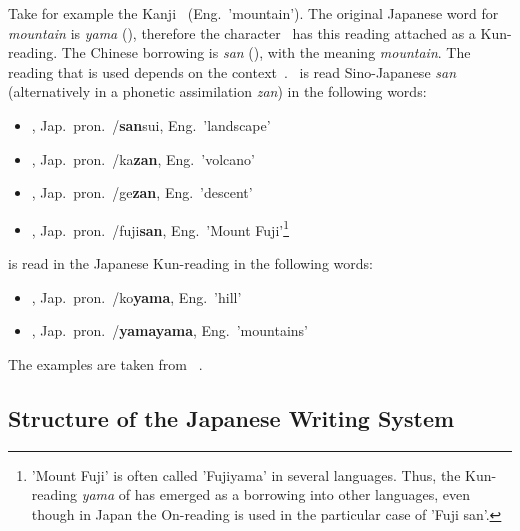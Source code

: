 Take for example the Kanji ~(Eng.\ 'mountain'). 
The original Japanese word for \emph{mountain} is \emph{yama} (),
therefore the character ~has this reading attached as a Kun-reading.
The Chinese borrowing is \emph{san} (), with the meaning 
\emph{mountain}. The reading that is used depends on the 
context~.
~is read Sino-Japanese \emph{san} (alternatively in a phonetic 
assimilation \emph{zan}) in the following words:
\begin{itemize}
  \item {}, Jap.\ pron.\ /\textbf{san}sui, Eng.\ 'landscape'
  \item {}, Jap.\ pron.\ /ka\textbf{zan}, Eng.\ 'volcano'
  \item {}, Jap.\ pron.\ /ge\textbf{zan}, Eng.\ 'descent'
  \item {}, Jap.\ pron.\ /fuji\textbf{san}, Eng.\ 
        'Mount Fuji'\footnote{'Mount Fuji' is often called 'Fujiyama' in 
        several languages. Thus, the Kun-reading \emph{yama} of \cjk{山} has 
        emerged as a borrowing into other languages, even though in Japan 
        the On-reading is used in the particular case of 'Fuji san'.}
\end{itemize}
 is read in the Japanese Kun-reading in the following words:
\begin{itemize}
  \item {}, Jap.\ pron.\ /ko\textbf{yama}, Eng.\ 'hill'
  \item \cjk{山山}, Jap.\ pron.\ \cjk{ヤマヤマ}/\textbf{yamayama}, Eng.\ 'mountains'
\end{itemize}
The examples are taken from 
~\citeyear{Hadamitzky1995}.

\subsection{Structure of the Japanese Writing System}
\label{sec:structureofwritingsystem}

